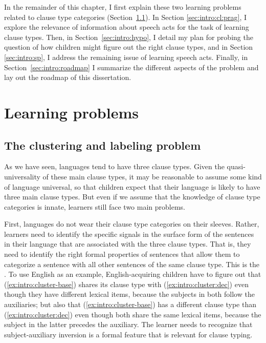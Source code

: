 
In the remainder of this chapter, I first explain these two learning problems related to clause type categories (Section~\ref{sec:intro:cl:problem}). In Section \ref{sec:intro:cl:prag}, I explore the relevance of information about speech acts for the task of learning clause types. Then, in Section~\ref{sec:intro:hypo}, I detail my plan for probing the question of how children might figure out the right clause types, and in Section \ref{sec:intro:sp}, I address the remaining issue of learning speech acts. Finally, in Section~\ref{sec:intro:roadmap} I summarize the different aspects of the problem and lay out the roadmap of this dissertation. 

\section{Learning problems}
\label{sec:intro:cl}
\subsection{The clustering and labeling problem}
\label{sec:intro:cl:problem}

As we have seen, languages tend to have three clause types.  Given the quasi-universality of these main clause types, it may be reasonable to assume some kind of language universal, so that children expect that their language is likely to have three main clause types. But even if we assume that the knowledge of clause type categories is innate, learners still face two main problems.

First, languages do not wear their clause type categories on their sleeves. Rather, learners need to identify the specific signals in the surface form of the sentences in their language that are associated with the three clause types. That is, they need to identify the right formal properties of sentences that allow them to categorize a sentence with all other sentences of the same clause type. This is the .
To use English as an example, English-acquiring children have to figure out that (\ref{ex:intro:cluster-base}) shares its clause type with (\ref{ex:intro:cluster:dec}) even though they have different lexical items, because the subjects in both follow the auxiliaries; but also that (\ref{ex:intro:cluster-base}) has a different clause type than (\ref{ex:intro:cluster:dec}) even though both share the same lexical items, because the subject in the latter precedes the auxiliary. The learner needs to recognize that subject-auxiliary inversion is a formal feature that is relevant for clause typing.

